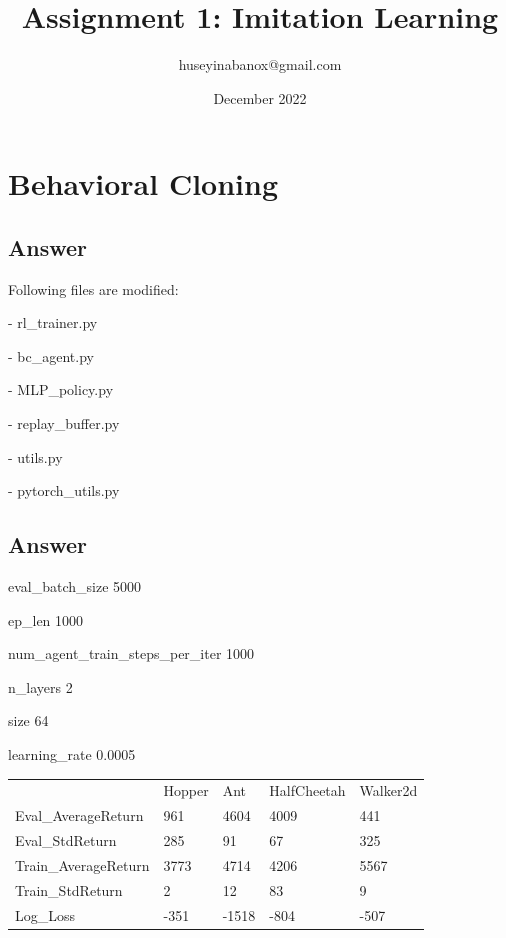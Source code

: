 \documentclass[11pt]{article}
\title{Assignment 1: Imitation Learning}
\author{huseyinabanox@gmail.com}
\date{December 2022}
\begin{document}
    \maketitle

    \section{Behavioral Cloning}

    \subsection{Answer}

    Following files are modified:

    - rl\_trainer.py

    - bc\_agent.py

    - MLP\_policy.py

    - replay\_buffer.py

    - utils.py

    - pytorch\_utils.py

    \subsection{Answer}


    \noindent eval\_batch\_size                                 5000

    \noindent ep\_len                                           1000

    \noindent num\_agent\_train\_steps\_per\_iter               1000

    \noindent n\_layers                                         2

    \noindent size                                              64

    \noindent learning\_rate                                    0.0005


    \begin{table}[]
        \begin{tabular}{lllll}
                                 & Hopper & Ant   & HalfCheetah & Walker2d \\
            Eval\_AverageReturn  & 961    & 4604  & 4009        & 441      \\
            Eval\_StdReturn      & 285    & 91    & 67          & 325      \\
            Train\_AverageReturn & 3773   & 4714  & 4206        & 5567     \\
            Train\_StdReturn     & 2      & 12    & 83          & 9        \\
            Log\_Loss            & -351   & -1518 & -804        & -507
        \end{tabular}
    \end{table}
\end{document}
